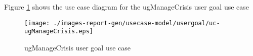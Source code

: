 Figure \ref{fig:lu.uni.lassy.excalibur.examples.icrash-RE-UCD-uc-ugManageCrisis}
shows the use case diagram for the ugManageCrisis user goal use case

\begin{figure}[htbp]
\begin{center}

\texttt{[image: ./images-report-gen/usecase-model/usergoal/uc-ugManageCrisis.eps]}
\end{center}
\caption[lu.uni.lassy.excalibur.examples.icrash Use Case Diagram: uc-ugManageCrisis]{ ugManageCrisis user goal use case}
\label{fig:lu.uni.lassy.excalibur.examples.icrash-RE-UCD-uc-ugManageCrisis}
\end{figure}
\vspace{0.5cm}
